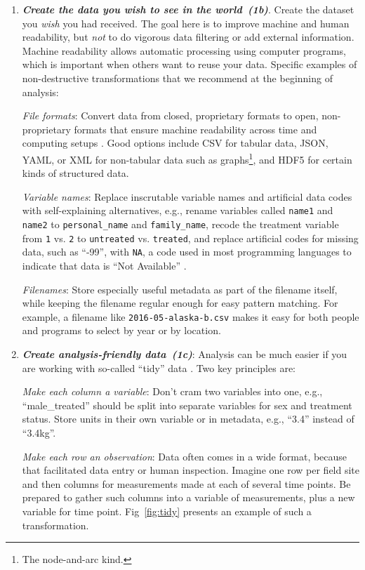 \documentclass[10pt,letterpaper]{article}
\newcommand{\practice}[2]{\textbf{\emph{{#2}~({#1})}}}
\begin{document}
\begin{enumerate}
\item

  \practice{1b}{Create the data you wish to see in the world}. Create
  the dataset you \emph{wish} you had received.  The goal here is to
  improve machine and human readability, but \emph{not} to do vigorous
  data filtering or add external information.  Machine readability
  allows automatic processing using computer programs, which is
  important when others want to reuse your data.  Specific examples of
  non-destructive transformations that we recommend at the beginning
  of analysis:

  \emph{File formats}: Convert data from closed, proprietary formats
  to open, non-proprietary formats that ensure machine readability
  across time and computing setups \cite{ffIllinois}. Good options
  include CSV for tabular data, JSON, YAML, or XML for non-tabular
  data such as graphs\footnote{The node-and-arc kind.}, and HDF5 for
  certain kinds of structured data.

  \emph{Variable names}: Replace inscrutable variable names and
  artificial data codes with self-explaining alternatives, e.g.,
  rename variables called \texttt{name1} and \texttt{name2} to
  \texttt{personal\_name} and \texttt{family\_name}, recode the
  treatment variable from \texttt{1} vs.  \texttt{2} to
  \texttt{untreated} vs. \texttt{treated}, and replace artificial
  codes for missing data, such as ``-99'', with \texttt{NA}, a code
  used in most programming languages to indicate that data is ``Not
  Available'' \cite{white2013}.

  \emph{Filenames}: Store especially useful metadata as part of the
  filename itself, while keeping the filename regular enough for easy
  pattern matching. For example, a filename like
  \texttt{2016-05-alaska-b.csv} makes it easy for both people and
  programs to select by year or by location.

\item

  \practice{1c}{Create analysis-friendly data}: Analysis can be much
  easier if you are working with so-called ``tidy'' data
  \cite{wickham2014}. Two key principles are:

  \emph{Make each column a variable}: Don't cram two variables into
  one, e.g., ``male\_treated'' should be split into separate variables
  for sex and treatment status.  Store units in their own variable or
  in metadata, e.g., ``3.4'' instead of ``3.4kg''.

  \emph{Make each row an observation}: Data often comes in a wide
  format, because that facilitated data entry or human
  inspection. Imagine one row per field site and then columns for
  measurements made at each of several time points. Be prepared to
  gather such columns into a variable of measurements, plus a new
  variable for time point.  Fig~\ref{fig:tidy} presents an example of
  such a transformation.


\end{enumerate}
\end{document}

